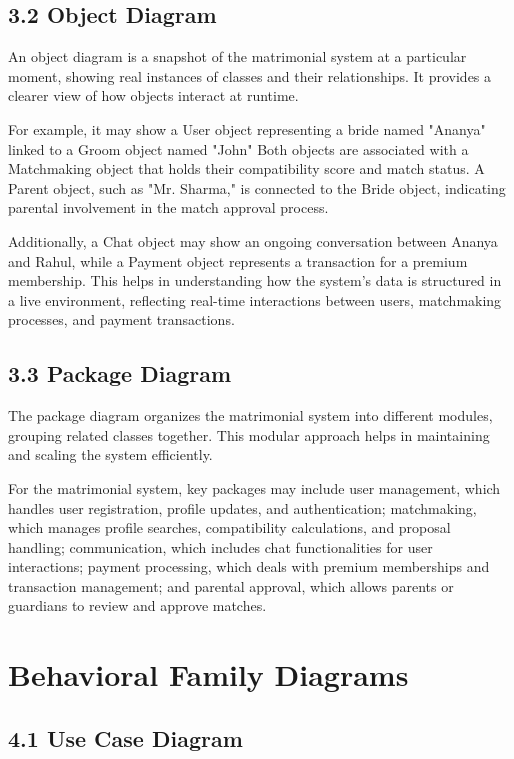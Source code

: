 \subsection{3.2 Object Diagram}\label{object-diagram}

An object diagram is a snapshot of the matrimonial system at a
particular moment, showing real instances of classes and their
relationships. It provides a clearer view of how objects interact at
runtime.

For example, it may show a User object representing a bride named
"Ananya" linked to a Groom object named "John" Both objects are
associated with a Matchmaking object that holds their compatibility
score and match status. A Parent object, such as "Mr. Sharma," is
connected to the Bride object, indicating parental involvement in the
match approval process.

Additionally, a Chat object may show an ongoing conversation between
Ananya and Rahul, while a Payment object represents a transaction for a
premium membership. This helps in understanding how the system's data is
structured in a live environment, reflecting real-time interactions
between users, matchmaking processes, and payment transactions.

\subsection{3.3 Package Diagram}\label{package-diagram}

The package diagram organizes the matrimonial system into different
modules, grouping related classes together. This modular approach helps
in maintaining and scaling the system efficiently.

For the matrimonial system, key packages may include user management,
which handles user registration, profile updates, and authentication;
matchmaking, which manages profile searches, compatibility calculations,
and proposal handling; communication, which includes chat
functionalities for user interactions; payment processing, which deals
with premium memberships and transaction management; and parental
approval, which allows parents or guardians to review and approve
matches.

\section{Behavioral Family Diagrams}\label{behavioral-family-diagrams}

\subsection{4.1 Use Case Diagram}\label{use-case-diagram}

